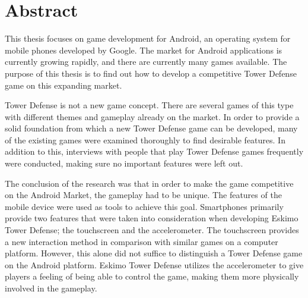 \section*{Abstract}

This thesis focuses on game development for Android, an operating system for mobile phones developed by Google. The market for Android applications is currently growing rapidly, and there are currently many games available. The purpose of this thesis is to find out how to develop a competitive Tower Defense game on this expanding market.

Tower Defense is not a new game concept. There are several games of this type with different  themes and gameplay already on the market. In order to provide a solid foundation from which a new Tower Defense game can be developed, many of the existing games were examined thoroughly to find desirable features. In addition to this, interviews with people that play Tower Defense games frequently were conducted, making sure no important features were left out.

The conclusion of the research was that in order to make the game competitive on the Android Market, the gameplay had to be unique. The features of the mobile device were used as tools to achieve this goal. Smartphones primarily provide two features that were taken into consideration when developing Eskimo Tower Defense; the touchscreen and the accelerometer. The touchscreen provides a new interaction method in comparison with similar games on a computer platform. However, this alone did not suffice to distinguish a Tower Defense game on the Android platform. Eskimo Tower Defense utilizes the accelerometer to give players a feeling of being able to control the game, making them more physically involved in the gameplay.
